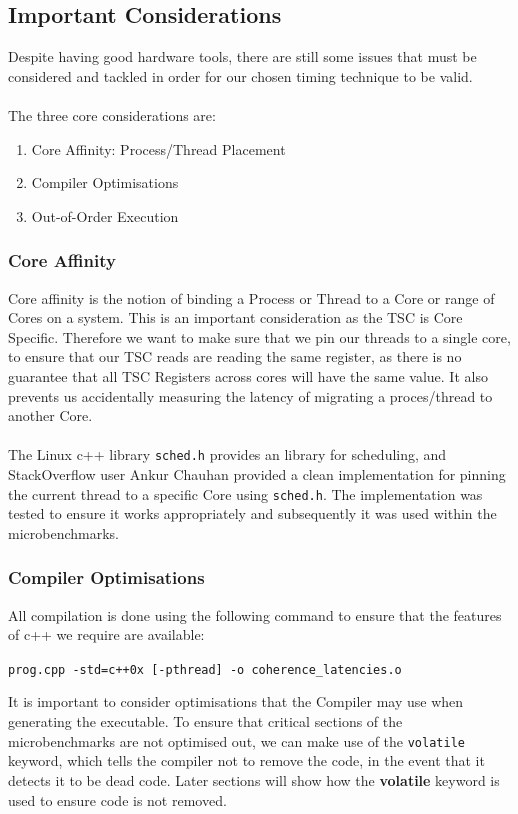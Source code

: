 \documentclass[bsc,frontabs,twoside,singlespacing,parskip,deptreport]{infthesis}     %
\begin{document}
\subsection{Important Considerations}
Despite having good hardware tools, there are still some issues that must be considered and tackled in order for our chosen timing technique to be valid. \\
\\
The three core considerations are:
\begin{enumerate}
    \item Core Affinity: Process/Thread Placement
    \item Compiler Optimisations
    \item Out-of-Order Execution
\end{enumerate}

\subsubsection{Core Affinity}
Core affinity is the notion of binding a Process or Thread to a Core or range of Cores on a system. This is an important consideration as the  TSC is Core Specific. Therefore we want to make sure that we pin our threads to a single core, to ensure that our TSC reads are reading the same register, as there is no guarantee that all TSC Registers across cores will have the same value. It also prevents us accidentally measuring the latency of migrating a proces/thread to another Core.\\
\\
The Linux c++ library \texttt{sched.h} provides an library for scheduling, and StackOverflow user Ankur Chauhan provided a clean implementation\cite{corepin_src} for pinning the current thread to a specific Core using \texttt{sched.h}. The implementation was tested to ensure it works appropriately and subsequently it was used within the microbenchmarks.

\subsubsection{Compiler Optimisations}\label{compiler-optimisations}

All compilation is done using the following command to ensure that the features of c++ we require are available:
\begin{center}
    \texttt{prog.cpp -std=c++0x [-pthread] -o coherence\_latencies.o}
\end{center}
It is important to consider optimisations that the Compiler may use when generating the executable. To ensure that critical sections of the microbenchmarks are not optimised out, we can make use of the \texttt{volatile} keyword, which tells the compiler not to remove the code, in the event that it detects it to be dead code. Later sections will show how the \textbf{volatile} keyword is used to ensure code is not removed.
\end{document}
